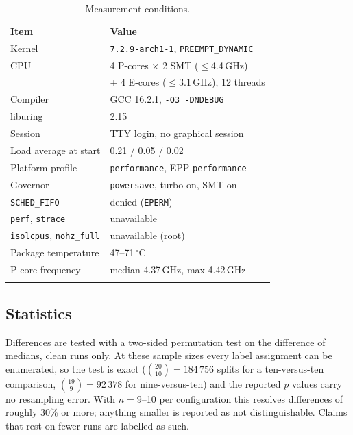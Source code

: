 \documentclass[conference]{IEEEtran}
\begin{document}
\begin{table}[!t]
\centering
\caption{Measurement conditions.}
\label{tab:conditions}
\small
\setlength{\tabcolsep}{4pt}
\begin{tabular}{@{}ll@{}}
\arrayrulecolor{cblue}\toprule
\rowcolor{cblueL}\textbf{Item} & \textbf{Value} \\
\arrayrulecolor{black!25}\midrule
Kernel      & \texttt{7.2.9-arch1-1}, \texttt{PREEMPT\_DYNAMIC} \\
CPU         & 4 P-cores $\times$ 2 SMT ($\le$4.4\,GHz) \\
            & + 4 E-cores ($\le$3.1\,GHz), 12 threads \\
Compiler    & GCC 16.2.1, \texttt{-O3 -DNDEBUG} \\
liburing    & 2.15 \\
Session     & TTY login, no graphical session \\
Load average at start & 0.21 / 0.05 / 0.02 \\
Platform profile & \texttt{performance}, EPP \texttt{performance} \\
Governor    & \texttt{powersave}, turbo on, SMT on \\
\texttt{SCHED\_FIFO} & denied (\texttt{EPERM}) \\
\texttt{perf}, \texttt{strace} & unavailable \\
\texttt{isolcpus}, \texttt{nohz\_full} & unavailable (root) \\
Package temperature & 47--71\,$^\circ$C \\
P-core frequency & median 4.37\,GHz, max 4.42\,GHz \\
\arrayrulecolor{cblue}\bottomrule
\end{tabular}
\end{table}

\subsection{Statistics}
Differences are tested with a two-sided permutation test on the difference of
medians, clean runs only. At these sample sizes every label assignment can be
enumerated, so the test is exact ($\binom{20}{10}=184\,756$ splits for a
ten-versus-ten comparison, $\binom{19}{9}=92\,378$ for nine-versus-ten) and the
reported $p$ values carry no resampling error. With $n=9$--10 per configuration
this resolves differences of roughly 30\% or more; anything smaller is reported
as not distinguishable. Claims that rest on fewer runs are labelled as such.
\end{document}
